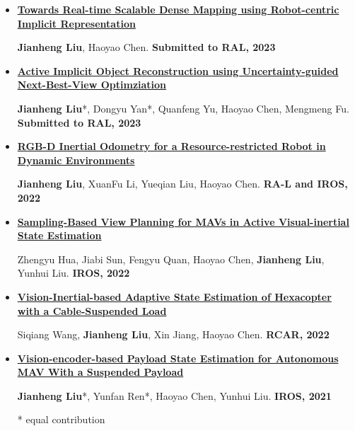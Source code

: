 \documentclass[11pt,a4paper,sans]{moderncv}        %
\begin{document}
\begin{itemize}

    \item{\textbf{\href{https://github.com/HITSZ-NRSL/RIM}{Towards Real-time Scalable Dense Mapping using Robot-centric Implicit Representation}}

    \small{\textbf{Jianheng Liu}, Haoyao Chen. \textbf{Submitted to RAL, 2023}}
    }
    
    \vspace{3pt}

    \item{\textbf{\href{https://arxiv.org/abs/2303.16739}{Active Implicit Object Reconstruction using Uncertainty-guided Next-Best-View Optimziation}}

    \small{\textbf{Jianheng Liu}*, Dongyu Yan*, Quanfeng Yu, Haoyao Chen, Mengmeng Fu. \textbf{Submitted to RAL, 2023}}
    }
    
    \vspace{3pt}


    \item{\textbf{\href{https://github.com/HITSZ-NRSL/Dynamic-VINS}{RGB-D Inertial Odometry for a Resource-restricted Robot in Dynamic Environments}}

    \small{\textbf{Jianheng Liu}, XuanFu Li, Yueqian Liu, Haoyao Chen. \textbf{RA-L and IROS, 2022}}
    }

    \vspace{3pt}

    \item{\textbf{\href{https://ieeexplore.ieee.org/abstract/document/9981941/}{Sampling-Based View Planning for MAVs in Active Visual-inertial State Estimation}}

    \small{Zhengyu Hua, Jiabi Sun, Fengyu Quan, Haoyao Chen, \textbf{Jianheng Liu}, Yunhui Liu. \textbf{IROS, 2022}}
    }

    \vspace{3pt}

    
    \item{\textbf{\href{https://ieeexplore.ieee.org/abstract/document/9872194}{Vision-Inertial-based Adaptive State Estimation of Hexacopter with a Cable-Suspended Load}}

    \small{Siqiang Wang, \textbf{Jianheng Liu}, Xin Jiang, Haoyao Chen. \textbf{RCAR, 2022}}
    }

    \vspace{3pt}
    

    \item{\textbf{\href{https://github.com/jianhengLiu/Vision-encoder-based-Payload-State-Estimator}{Vision-encoder-based Payload State Estimation for Autonomous MAV With a Suspended Payload}}

    \small{\textbf{Jianheng Liu}*, Yunfan Ren*, Haoyao Chen, Yunhui Liu. \textbf{IROS, 2021}}
    }

\footnotesize{* equal contribution}

\end{itemize}
\end{document}
